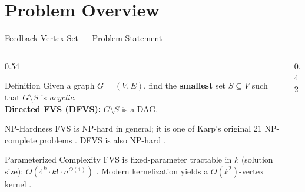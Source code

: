 \documentclass[aspectratio=169,10pt]{beamer}
\begin{document}
\section{Problem Overview}

\begin{frame}{Feedback Vertex Set — Problem Statement}
  \begin{columns}[T]
    \begin{column}{0.54\textwidth}
      \begin{block}{Definition}
        Given a graph $G=(V,E)$, find the \textbf{smallest} set
        $S \subseteq V$ such that $G \setminus S$ is \emph{acyclic}.\\[4pt]
        \textbf{Directed FVS (DFVS):} $G \setminus S$ is a DAG.
      \end{block}
      \vspace{4pt}
      \begin{alertblock}{NP-Hardness}
        FVS is NP-hard in general; it is one of Karp's original 21
        NP-complete problems \cite{karp1972}.
        DFVS is also NP-hard \cite{karp1972}.
      \end{alertblock}
      \vspace{4pt}
      \begin{block}{Parameterized Complexity}
        FVS is fixed-parameter tractable in $k$ (solution size):
        $O(4^k \cdot k! \cdot n^{O(1)})$ \cite{becker2000}.
        Modern kernelization yields a $O(k^2)$-vertex kernel
        \cite{thomasse2010}.
      \end{block}
    \end{column}
    \begin{column}{0.42\textwidth}
      \begin{center}
\end{center}
\end{column}
\end{columns}
\end{frame}
\end{document}
